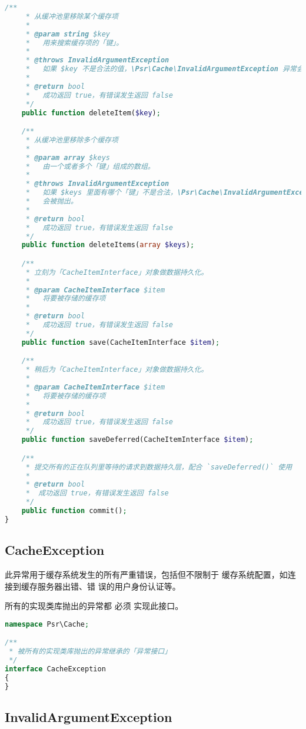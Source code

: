 \begin{lstlisting}[language=PHP]
    /**
     * 从缓冲池里移除某个缓存项
     *
     * @param string $key
     *   用来搜索缓存项的「键」。
     *
     * @throws InvalidArgumentException
     *   如果 $key 不是合法的值，\Psr\Cache\InvalidArgumentException 异常会被抛出。
     *
     * @return bool
     *   成功返回 true，有错误发生返回 false
     */
    public function deleteItem($key);

    /**
     * 从缓冲池里移除多个缓存项
     *
     * @param array $keys
     *   由一个或者多个「键」组成的数组。
     *   
     * @throws InvalidArgumentException
     *   如果 $keys 里面有哪个「键」不是合法，\Psr\Cache\InvalidArgumentException 异常
     *   会被抛出。
     *
     * @return bool
     *   成功返回 true，有错误发生返回 false
     */
    public function deleteItems(array $keys);

    /**
     * 立刻为「CacheItemInterface」对象做数据持久化。
     *
     * @param CacheItemInterface $item
     *   将要被存储的缓存项
     *
     * @return bool
     *   成功返回 true，有错误发生返回 false
     */
    public function save(CacheItemInterface $item);

    /**
     * 稍后为「CacheItemInterface」对象做数据持久化。
     *
     * @param CacheItemInterface $item
     *   将要被存储的缓存项
     *
     * @return bool
     *   成功返回 true，有错误发生返回 false
     */
    public function saveDeferred(CacheItemInterface $item);

    /**
     * 提交所有的正在队列里等待的请求到数据持久层，配合 `saveDeferred()` 使用
     *
     * @return bool
     *  成功返回 true，有错误发生返回 false
     */
    public function commit();
}
\end{lstlisting}



\subsection{CacheException}

此异常用于缓存系统发生的所有严重错误，包括但不限制于 缓存系统配置，如连接到缓存服务器出错、错 误的用户身份认证等。

所有的实现类库抛出的异常都 必须 实现此接口。


\begin{lstlisting}[language=PHP]
namespace Psr\Cache;

/**
 * 被所有的实现类库抛出的异常继承的「异常接口」
 */
interface CacheException
{
}
\end{lstlisting}

\subsection{InvalidArgumentException}


